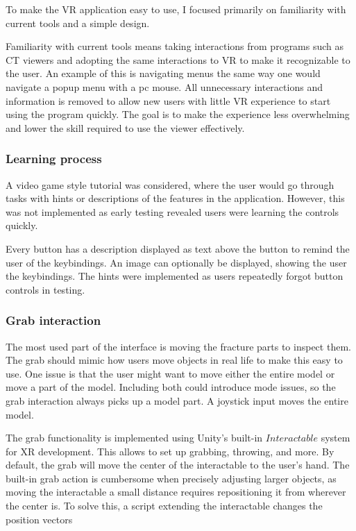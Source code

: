 \documentclass[a4paper]{report}
\begin{document}
To make the VR application easy to use, I focused primarily on familiarity with current tools and a simple design.

Familiarity with current tools means taking interactions from programs such as CT viewers and adopting the same interactions to VR to make it recognizable to the user. An example of this is navigating menus the same way one would navigate a popup menu with a pc mouse.
 All unnecessary interactions and information is removed to allow new users with little VR experience to start using the program quickly. The goal is to make the experience less overwhelming and lower the skill required to use the viewer effectively.

\subsubsection{Learning process}
A video game style tutorial was considered, where the user would go through tasks with hints or descriptions of the features in the application. However, this was not implemented as early testing revealed users were learning the controls quickly.

Every button has a description displayed as text above the button to remind the user of the keybindings. An image can optionally be displayed, showing the user the keybindings. The hints were implemented as users repeatedly forgot button controls in testing.

\subsubsection{Grab interaction}

The most used part of the interface is moving the fracture parts to inspect them. The grab should mimic how users move objects in real life to make this easy to use.
One issue is that the user might want to move either the entire model or move a part of the model. Including both could introduce mode issues\cite{nngroup}, so the grab interaction always picks up a model part. A joystick input moves the entire model.

The grab functionality is implemented using Unity's built-in $Interactable$ system for XR\cite{noauthor_xr_nodate} development. This allows to set up grabbing, throwing, and more. 
By default, the grab will move the center of the interactable to the user's hand. The built-in grab action is cumbersome when precisely adjusting larger objects, as moving the interactable a small distance requires repositioning it from wherever the center is. To solve this, a script extending the interactable changes the position vectors 
\end{document}

